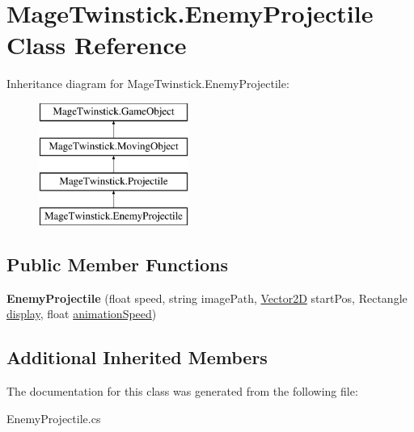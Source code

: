 \hypertarget{class_mage_twinstick_1_1_enemy_projectile}{}\section{Mage\+Twinstick.\+Enemy\+Projectile Class Reference}
\label{class_mage_twinstick_1_1_enemy_projectile}
Inheritance diagram for Mage\+Twinstick.\+Enemy\+Projectile\+:\begin{figure}[H]
\begin{center}
\leavevmode
\includegraphics[height=4.000000cm]{class_mage_twinstick_1_1_enemy_projectile}
\end{center}
\end{figure}
\subsection*{Public Member Functions}
\begin{DoxyCompactItemize}
\item 
\hypertarget{class_mage_twinstick_1_1_enemy_projectile_aeddaa709304e1f22c45c82202b385352}{}{\bfseries Enemy\+Projectile} (float speed, string image\+Path, \hyperlink{class_mage_twinstick_1_1_vector2_d}{Vector2\+D} start\+Pos, Rectangle \hyperlink{class_mage_twinstick_1_1_game_object_a5807df7f837dc87c8955a008d0b27b50}{display}, float \hyperlink{class_mage_twinstick_1_1_game_object_a5d21c31402c27c5a19f2a62d98720456}{animation\+Speed})\label{class_mage_twinstick_1_1_enemy_projectile_aeddaa709304e1f22c45c82202b385352}

\end{DoxyCompactItemize}
\subsection*{Additional Inherited Members}


The documentation for this class was generated from the following file\+:\begin{DoxyCompactItemize}
\item 
Enemy\+Projectile.\+cs\end{DoxyCompactItemize}
